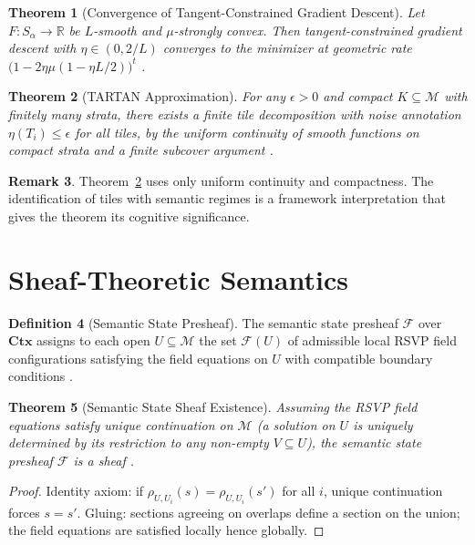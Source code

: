 \documentclass[12pt, a4paper]{article}
\theoremstyle{rsvpstyle}
\newtheorem{theorem}{Theorem}[section]
\theoremstyle{definition}
\newtheorem{definition}[theorem]{Definition}
\newtheorem{remark}[theorem]{Remark}
\newcommand{\OpMan}{\mathcal{M}}
\begin{document}
\begin{theorem}[Convergence of Tangent-Constrained Gradient Descent]
\label{thm:tcgd}
Let $F : S_\alpha \to \mathbb{R}$ be $L$-smooth and $\mu$-strongly convex.
Then tangent-constrained gradient descent with $\eta \in (0, 2/L)$ converges
to the minimizer at geometric rate $\bigl(1 - 2\eta\mu(1-\eta L/2)\bigr)^t$
\citep{Lee2013}.
\end{theorem}

\begin{theorem}[TARTAN Approximation]
\label{thm:tartan}
For any $\epsilon > 0$ and compact $K \subseteq \OpMan$ with finitely many
strata, there exists a finite tile decomposition with noise annotation
$\eta(T_i) \leq \epsilon$ for all tiles, by the uniform continuity of smooth
functions on compact strata and a finite subcover argument \citep{Whitney1965}.
\end{theorem}

\begin{remark}
Theorem~\ref{thm:tartan} uses only uniform continuity and compactness.
The identification of tiles with semantic regimes is a framework interpretation that gives the theorem its cognitive significance.
\end{remark}

\section{Sheaf-Theoretic Semantics}

\begin{definition}[Semantic State Presheaf]
The semantic state presheaf $\mathcal{F}$ over $\mathbf{Ctx}$ assigns to each
open $U \subseteq \OpMan$ the set $\mathcal{F}(U)$ of admissible local RSVP
field configurations satisfying the field equations on $U$ with compatible
boundary conditions \citep{Godement1958}.
\end{definition}

\begin{theorem}[Semantic State Sheaf Existence]
\label{thm:sheaf}
\emph{Assuming} the RSVP field equations satisfy unique continuation on $\OpMan$
(a solution on $U$ is uniquely determined by its restriction to any non-empty
$V \subseteq U$), the semantic state presheaf $\mathcal{F}$ is a sheaf
\citep{Godement1958}.
\end{theorem}

\begin{proof}
Identity axiom: if $\rho_{U,U_i}(s) = \rho_{U,U_i}(s')$ for all $i$, unique
continuation forces $s = s'$. Gluing: sections agreeing on overlaps define a
section on the union; the field equations are satisfied locally hence globally.
\end{proof}
\end{document}
